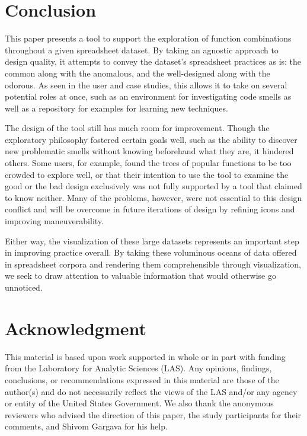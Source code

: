\documentclass[conference]{IEEEtran}
\begin{document}
	\section{Conclusion}
	
	This paper presents a tool to support the exploration of function combinations
	throughout a given spreadsheet dataset. By taking an agnostic approach to
	design quality, it attempts to convey the dataset's spreadsheet practices as
	is: the common along with the anomalous, and the well-designed along with the
	odorous. As seen in the user and case studies, this allows it to take on
	several potential roles at once, such as an environment for investigating code
	smells as well as a repository for examples for learning new techniques.
	
	The design of the tool still has much room for improvement. Though the
	exploratory philosophy fostered certain goals well, such as the ability to
	discover new problematic smells without knowing beforehand what they are, it
	hindered others. Some users, for example, found the trees of popular functions
	to be too crowded to explore well, or that their intention to use the tool to
	examine the good or the bad design exclusively was not fully supported by a
	tool that claimed to know neither. Many of the problems, however, were not
	essential to this design conflict and will be overcome in future iterations of
	design by refining icons and improving maneuverability.
	
	Either way, the visualization of these large datasets represents an important
	step in improving practice overall. By taking these voluminous oceans of data
	offered in spreadsheet corpora and rendering them comprehensible through
	visualization, we seek to draw attention to valuable information that would
	otherwise go unnoticed.
	
	\section*{Acknowledgment}
	
	This material is based upon work supported in whole or in part with funding
	from the Laboratory for Analytic Sciences (LAS). Any opinions, findings,
	conclusions, or recommendations expressed in this material are those of the
	author(s) and do not necessarily reflect the views of the LAS and/or any agency
	or entity of the United States Government. We also thank the anonymous reviewers
	who advised the direction of this paper, the study participants for their comments,
	and Shivom Gargava for his help.
	
\end{document}
